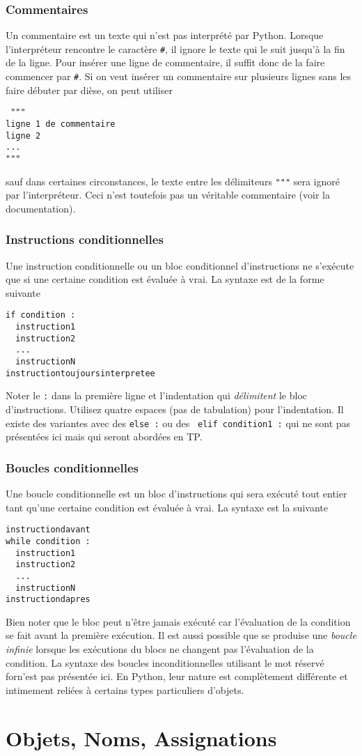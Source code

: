 \subsubsection{Commentaires}
Un commentaire est un texte qui n'est pas interprété par Python. Lorsque l'interpréteur rencontre le caractère \verb|#|, il ignore le texte qui le suit jusqu'à la fin de la ligne. Pour insérer une ligne de commentaire, il suffit donc de la faire commencer par \verb|#|.\newline
Si on veut insérer un commentaire sur plusieurs lignes sans les faire débuter par dièse, on peut utiliser 
\begin{verbatim}
 """
ligne 1 de commentaire
ligne 2
...
"""
\end{verbatim}
sauf dans certaines circonstances, le texte entre les délimiteurs \verb|"""| sera ignoré par l'interpréteur. Ceci n'est toutefois pas un véritable commentaire (voir la documentation). 

\subsubsection{Instructions conditionnelles}
Une instruction conditionnelle ou un bloc conditionnel d'instructions  ne s'exécute que si une certaine condition est évaluée à vrai. La syntaxe est de la forme suivante
\begin{verbatim}
if condition :
  instruction1
  instruction2
  ...
  instructionN
instructiontoujoursinterpretee
\end{verbatim}
Noter le \verb|:| dans la première ligne et l'indentation qui \emph{délimitent} le bloc d'instructions. Utilisez quatre espaces (pas de tabulation) pour l'indentation.\newline
Il existe des variantes avec des \verb|else :| ou des \verb| elif condition1 :| qui ne sont pas présentées ici mais qui seront abordées en TP.

\subsubsection{Boucles conditionnelles}
Une boucle conditionnelle est un bloc d'instructions  qui sera exécuté tout entier tant qu'une certaine condition est évaluée à vrai. La syntaxe est la suivante
\begin{verbatim}
instructiondavant
while condition :
  instruction1
  instruction2
  ...
  instructionN
instructiondapres
\end{verbatim}
Bien noter que le bloc peut n'être jamais exécuté car l'évaluation de la condition se fait avant la première exécution. Il est aussi possible que se produise une \emph{boucle infinie} lorsque les exécutions du blocs ne changent pas l'évaluation de la condition.\newline
La syntaxe des boucles inconditionnelles utilisant le mot réservé \og for\fg n'est pas présentée ici. En Python, leur nature est complètement différente et intimement reliées à certains types particuliers d'objets.

\section{Objets, Noms, Assignations}


\printindex

